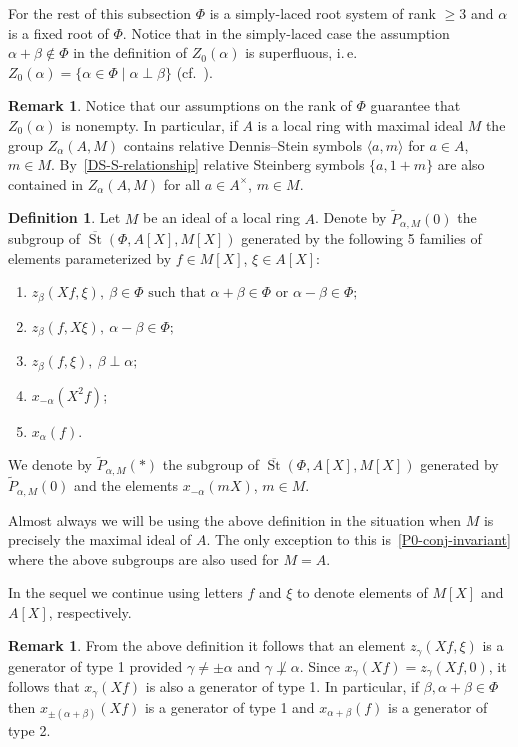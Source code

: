 \documentclass[oneside, 8pt]{amsart}
\theoremstyle{remark}
\theoremstyle{definition}
\numberwithin{lemma}{section}
\numberwithin{prop}{section}
\numberwithin{corollary}{section}
\numberwithin{externaltheorem}{section}
\newtheorem{df}[lemma]{Definition} \Crefname{df}{Definition}{Definitions}
\newtheorem{rem}[lemma]{Remark}
\DeclareMathOperator{\St}{St}
\numberwithin{equation}{section}
\begin{document}
For the rest of this subsection $\Phi$ is a simply-laced root system of rank $\geq 3$ and $\alpha$ is a fixed root of $\Phi$. Notice that in the simply-laced case the assumption $\alpha+\beta\not\in \Phi$ in the definition of $Z_0(\alpha)$ is superfluous, i.\,e. $Z_0(\alpha) = \{ \alpha\in\Phi \mid \alpha \perp \beta \}$
(cf.~\cite[Proposition~5.7]{St71}).

\begin{rem}\label{Z-DS} Notice that our assumptions on the rank of $\Phi$ guarantee that $Z_0(\alpha)$ is nonempty. In particular, if $A$ is a local ring with maximal ideal $M$ the group $Z_\alpha(A, M)$ contains relative Dennis--Stein symbols $\langle a, m \rangle$ for $a\in A$, $m\in M$.
By~\eqref{DS-S-relationship} relative Steinberg symbols $\{a, 1+m\}$ are also contained in $Z_\alpha(A, M)$ for all $a\in A^\times$, $m\in M$. \end{rem}

\begin{df} \label{defP0}
Let $M$ be an ideal of a local ring $A$. Denote by $\widetilde{P}_{\alpha, M}(0)$ the subgroup of $\overline{\St}(\Phi, A[X], M[X])$ generated by the following 5 families of elements parameterized by $f \in M[X]$, $\xi \in A[X]$:
\begin{enumerate} 
 \item $z_{\beta}(Xf, \xi),\ \beta \in \Phi \text{ such that }\alpha + \beta \in \Phi\text{ or } \alpha - \beta \in \Phi;$
 \item $z_{\beta}(f, X\xi),\ \alpha - \beta \in \Phi;$
 \item $z_{\beta}(f, \xi),\ \beta \perp \alpha;$
 \item $x_{-\alpha}(X^2f)$;
 \item $x_{\alpha}(f)$. \end{enumerate}

 We denote by $\widetilde{P}_{\alpha, M}(*)$ the subgroup of $\overline{\St}(\Phi, A[X], M[X])$ generated by $\widetilde{P}_{\alpha, M}(0)$ and the elements $x_{-\alpha}(mX)$, $m \in M$.
\end{df}
Almost always we will be using the above definition in the situation when $M$ is precisely the maximal ideal of $A$.
The only exception to this is~\cref{P0-conj-invariant} where the above subgroups are also used for $M=A$.

In the sequel we continue using letters $f$ and $\xi$ to denote elements of $M[X]$ and $A[X]$, respectively.

\begin{rem} \label{rem:recognition}
  From the above definition it follows that an element $z_\gamma(Xf, \xi)$ is a generator of type 1 provided $\gamma\neq\pm\alpha$ and $\gamma \not \perp \alpha$. Since $x_\gamma(Xf) = z_\gamma(Xf, 0)$, it follows that $x_{\gamma}(Xf)$ is also a generator of type 1. In particular, if $\beta, \alpha + \beta \in \Phi$ then $x_{\pm(\alpha+\beta)}(Xf)$ is a generator of type 1 and $x_{\alpha+\beta}(f)$ is a generator of type 2.
\end{rem}
\end{document}
